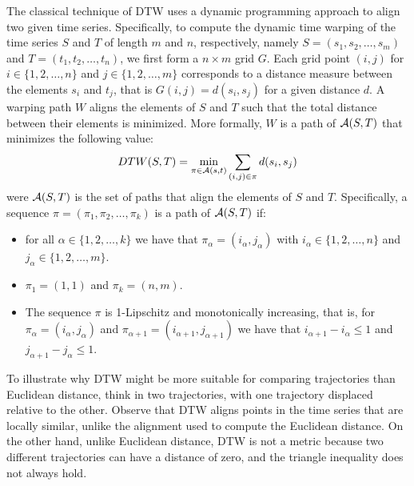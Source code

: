 \documentclass{article}
\begin{document}
The classical technique of DTW uses a dynamic programming approach to align two given time series. Specifically, to compute the dynamic time warping of the time series $S$ and $T$  of 
length $m$ and $n$, respectively, namely $S=(s_1,s_2,\dots,s_m)$ and $T=(t_1,t_2,\dots,t_n)$, we first form a $n\times m$ grid $G$.
Each grid point $(i,j)$ for $i\in\{1,2,\dots,n\}$ and 
$j\in\{1,2,\dots,m\} $
corresponds to a distance measure
 between the elements $s_i$ and $t_j$, that is
 $G(i,j)=d(s_i,s_j)$
 for a given distance $d$. 
 A warping
path $W$  aligns the elements of $S$ and $T$ such that the total distance between their elements is
minimized.
%
More formally, $W$ is a path of ${\cal A}(S,T)$ that minimizes the following value:
\[
DTW(S,T)=
\min_{\pi\in {\cal A}(s,t)}
\sum_{(i,j)\in\pi} d(s_i,s_j)
\]
 were ${\cal A}(S,T)$ is the set of paths that align the elements of $S$ and $T$. 
 Specifically, a sequence $\pi=(\pi_1,\pi_2,\dots,\pi_k)$ is a path of ${\cal A}(S,T)$ if:
 \begin{itemize}
          \item for all $\alpha\in\{1,2,\dots,k\}$ we have that  $\pi_{\alpha}=(i_{\alpha},j_{\alpha})$
     with $i_{\alpha}\in \{1,2,\dots,n\}$ and
     $j_{\alpha}\in \{1,2,\dots,m\}$.
     \item $\pi_1=(1,1)$ and $\pi_k=(n,m)$.
     \item The sequence $\pi$ is 1-Lipschitz  and monotonically increasing, that is,
     for $\pi_{\alpha}=(i_{\alpha},j_{\alpha})$ and 
     $\pi_{\alpha+1}=(i_{\alpha+1},j_{\alpha+1})$ we have that 
     $i_{\alpha+1}-i_{\alpha}\leq 1$  and 
     $  j_{\alpha+1}-j_{\alpha}\leq 1$.
 \end{itemize}

To illustrate why DTW might be more suitable for comparing trajectories than Euclidean distance, 
think in two trajectories,
with one trajectory displaced relative to the other. 
Observe that DTW aligns points in the time series that are locally similar, unlike the alignment used to compute the Euclidean distance. 
On the other hand, unlike Euclidean distance, DTW is not a metric because two different trajectories can have a distance of zero, and the triangle inequality does not always hold.
\end{document}
